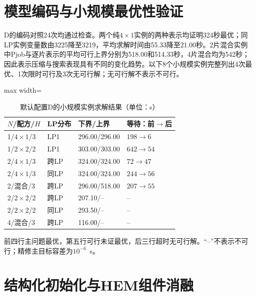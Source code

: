 \section{模型编码与小规模最优性验证}
D的编码对照24次均通过检查。两个纯$4\times1$实例的两种表示均证明324秒最优；同LP实例变量数由3225降至3219，平均求解时间由55.33降至21.00秒。2片混合实例中Pjob与逐片表示的平均可行上界分别为518.00和514.33秒，4片混合均为542秒；因此表示压缩与搜索表现具有不同的变化趋势。以下8个小规模实例完整列出4次最优、1次限时可行及3次无可行解；无可行解不表示不可行。
\begin{table}[!htbp]
\centering\small
\caption{默认配置D的小规模实例求解结果（单位：s）}
\label{tab:default-small-new-cn}

\begin{adjustbox}{max width=\linewidth}
\begin{tabular}{llll}\toprule
$N$/配方/$H$ & LP分布 & 下界/上界 & 等待：前$\to$后\\\midrule
1/$4\times1$/3 & LP1 & 296.00/296.00 & $198\to6$\\
1/$2\times2$/2 & LP1 & 303.00/303.00 & $642\to54$\\
2/$4\times1$/3 & 跨LP & 324.00/324.00 & $72\to47$\\
2/$4\times1$/3 & 同LP & 324.00/324.00 & $244\to56$\\
2/混合/3 & 跨LP & 296.00/518.00 & $207\to55$\\
2/$2\times2$/2 & 跨LP & 207.10/-- & --\\
2/$2\times2$/2 & 同LP & 293.50/-- & --\\
4/混合/3 & 跨LP & 116.00/-- & --\\
\bottomrule\end{tabular}
\end{adjustbox}
\par\smallskip\footnotesize 前四行主问题最优，第五行可行未证最优，后三行超时无可行解。``--''不表示不可行；精修主目标容差为$10^{-6}$~s。
\end{table}
\section{结构化初始化与HEM组件消融}\label{sec:journal-ablation-cn}\label{sec:algorithm-contribution-cn}

